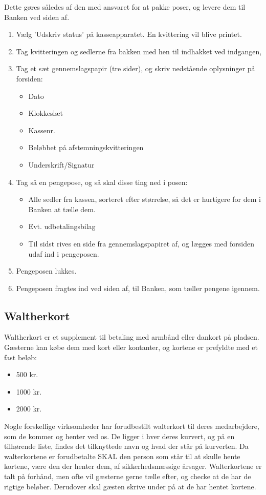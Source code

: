 Dette gøres således af den med ansvaret for at pakke poser, og levere dem til Banken ved siden af.
\begin{enumerate}
  \item Vælg 'Udskriv status' på kasseapparatet. En kvittering vil blive printet.
  \item Tag kvitteringen og sedlerne fra bakken med hen til indhakket ved indgangen, 
  \item Tag et sæt gennemslagspapir (tre sider), og skriv nedstående oplysninger på forsiden:
  \begin{itemize}
    \item Dato
    \item Klokkeslæt
    \item Kassenr.
    \item Beløbbet på afstemningskvitteringen
    \item Underskrift/Signatur
  \end{itemize}
  \item Tag så en pengepose, og så skal disse ting ned i posen:
  \begin{itemize}
    \item Alle sedler fra kassen, sorteret efter størrelse, så det er hurtigere for dem i Banken at 
    tælle dem. 
    \item Evt. udbetalingsbilag
    \item Til sidst rives en side fra gennemslagspapiret af, og lægges med forsiden udaf ind i pengeposen.
  \end{itemize}
  \item Pengeposen lukkes.
  \item Pengeposen fragtes ind ved siden af, til Banken, som tæller pengene igennem.
\end{enumerate}

\subsection{Waltherkort}
Waltherkort er et supplement til betaling med armbånd eller dankort på pladsen.
Gæsterne kan købe dem med kort eller kontanter, og kortene er prefyldte med et fast beløb:
\begin{itemize}
  \item 500 kr.
  \item 1000 kr.
  \item 2000 kr.
\end{itemize} 

Nogle forskellige virksomheder har forudbestilt walterkort til deres medarbejdere, 
som de kommer og henter ved os. 
De ligger i hver deres kurvert, og på en tilhørende liste, findes det tilknyttede navn 
og hvad der står på kurverten.
Da walterkortene er forudbetalte SKAL den person 
som står til at skulle hente kortene, være den der henter dem, af sikkerhedsmæssige årsager.
Walterkortene er talt på forhånd, men ofte vil gæsterne gerne tælle efter, 
og checke at de har de rigtige beløber.
Derudover skal gæsten skrive under på at de har hentet kortene.

